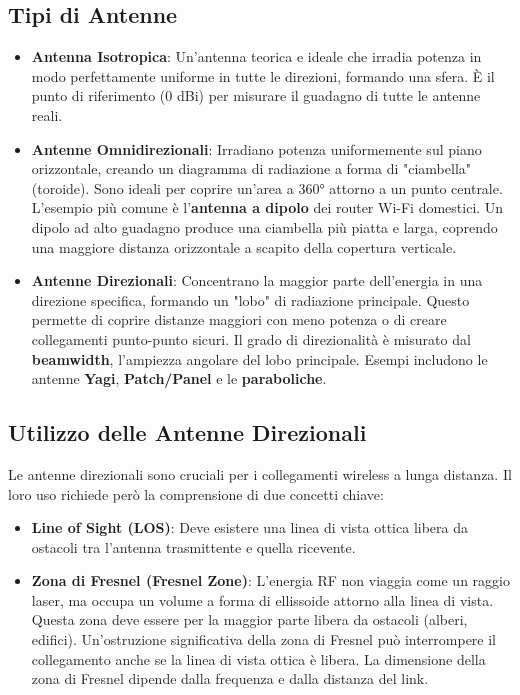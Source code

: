 \subsection{Tipi di Antenne}
\begin{itemize}
    \item \textbf{Antenna Isotropica}: Un'antenna teorica e ideale che irradia potenza in modo perfettamente uniforme in tutte le direzioni, formando una sfera. È il punto di riferimento (0 dBi) per misurare il guadagno di tutte le antenne reali.
    \item \textbf{Antenne Omnidirezionali}: Irradiano potenza uniformemente sul piano orizzontale, creando un diagramma di radiazione a forma di "ciambella" (toroide). Sono ideali per coprire un'area a 360° attorno a un punto centrale. L'esempio più comune è l'\textbf{antenna a dipolo} dei router Wi-Fi domestici. Un dipolo ad alto guadagno produce una ciambella più piatta e larga, coprendo una maggiore distanza orizzontale a scapito della copertura verticale.
    \item \textbf{Antenne Direzionali}: Concentrano la maggior parte dell'energia in una direzione specifica, formando un "lobo" di radiazione principale. Questo permette di coprire distanze maggiori con meno potenza o di creare collegamenti punto-punto sicuri. Il grado di direzionalità è misurato dal \textbf{beamwidth}, l'ampiezza angolare del lobo principale. Esempi includono le antenne \textbf{Yagi}, \textbf{Patch/Panel} e le \textbf{paraboliche}.
\end{itemize}


\subsection{Utilizzo delle Antenne Direzionali}
Le antenne direzionali sono cruciali per i collegamenti wireless a lunga distanza. Il loro uso richiede però la comprensione di due concetti chiave:
\begin{itemize}
    \item \textbf{Line of Sight (LOS)}: Deve esistere una linea di vista ottica libera da ostacoli tra l'antenna trasmittente e quella ricevente.
    \item \textbf{Zona di Fresnel (Fresnel Zone)}: L'energia RF non viaggia come un raggio laser, ma occupa un volume a forma di ellissoide attorno alla linea di vista. Questa zona deve essere per la maggior parte libera da ostacoli (alberi, edifici). Un'ostruzione significativa della zona di Fresnel può interrompere il collegamento anche se la linea di vista ottica è libera. La dimensione della zona di Fresnel dipende dalla frequenza e dalla distanza del link.
\end{itemize}

